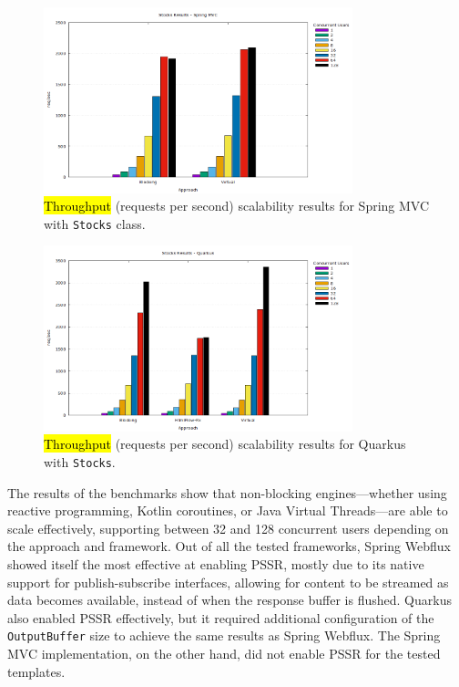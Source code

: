 \documentclass[software,article,accept,pdftex,moreauthors]{Definitions/mdpi}
\begin{document}
\begin{figure}[H]
\vspace{-3pt}
     \includegraphics[width=0.8\textwidth]{./Graphs/stocks-springmvc-jmeter.png}
     \caption{\hl{Throughput} %
 (requests per second) scalability results for Spring MVC with \texttt{Stocks} class.}\label{fig:stocks-springmvc-jmeter}
\end{figure}
\vspace{-6pt}
\begin{figure}[H]

     \includegraphics[width=0.8\textwidth]{./Graphs/stocks-quarkus-jmeter.png}
     \caption{\hl{Throughput} %
 (requests per second) scalability results for Quarkus with \texttt{Stocks}.}\label{fig:stocks-quarkus-jmeter}
\end{figure}



The results of the benchmarks show that non-blocking engines---whether using
reactive programming, Kotlin coroutines, or Java Virtual Threads---are able to
scale effectively, supporting between 32 and 128 concurrent users depending on
the approach and framework. Out of all the tested frameworks, Spring Webflux
showed itself the most effective at enabling PSSR, mostly due to its native
support for publish-subscribe interfaces, allowing for content to be streamed
as data becomes available, instead of when the response buffer is flushed.
Quarkus also enabled PSSR effectively, but it required additional configuration
of the \texttt{OutputBuffer} size to achieve the same results as Spring
Webflux. The Spring MVC implementation, on the other hand, did not enable PSSR
for the tested templates.
\end{document}
